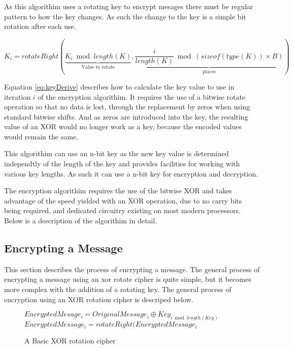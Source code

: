 \documentclass[12pt]{article}
\begin{document}
  As this algorithim uses a rotating key to encrypt mesages there
  must be regular pattern to how the key changes. As such the
  change to the key is a simple bit rotation after each use. 

  \begin{equation}
    \label{eq:keyDerive}
    K_i = rotateRight(
        \underbrace{K_i \bmod length(K)}_\text{Value to rotate},
        \underbrace{\frac{i}{length(K)} \bmod (sizeof(type(K)) 
            \times B)}_\text{places}) 
  \end{equation}

  Equation \eqref{eq:keyDerive} describes how to calculate the key 
  value to use in iteration \( i \) of the encryption algorithim. 
  It requires the use of a bitwise rotate operation so that no data 
  is lost, through the replacement by zeros when using standard 
  bitwise shifts. And as zeros are introduced into the key, the 
  resulting value of an XOR would no longer work as a key, because
  the encoded values would remain the same.

  This algorithim can use an n-bit key as the new key value is
  determined independtly of the length of the key and provides
  facilities for working with various key lengths. As such it can use
  a n-bit key for encryption and decryption.

  The encryption algorithim requires the use of the bitwise XOR and
  takes advantage of the speed yielded with an XOR operation, due to
  no carry bits being required, and dedicated circuitry existing on most
  modern processors. Below is a description of the algorithim in detail.

  \subsection{Encrypting a Message}
    This section describes the process of encrypting a message.
    The general process of encrypting a message using an xor rotate
    cipher is quite simple, but it becomes more complex with the
    addition of a rotating key. The general process of encryption
    using an XOR rotation cipher is descriped below. 
    
    \begin{figure}[h]
    \begin{algorithmic}[1]
      \State $EncryptedMesage_i =
             OriginalMessage_i \oplus Key_{i \bmod length(Key)}$
      \State $EncryptedMessage_i = rotateRight(EncryptedMessage_i$
    \EndFor 
    \end{algorithmic}
    \caption{A Basic XOR rotation cipher}
    \end{figure}
\end{document}
